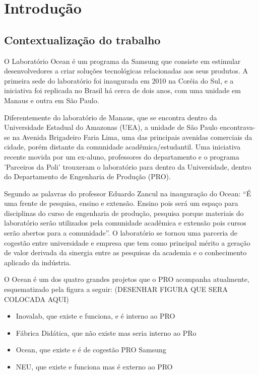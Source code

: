 \chapter[Introdução]{Introdução}
\label{chap:introducao}
\section{Contextualização do trabalho}
\label{cha:contexto}

O Laboratório Ocean é um programa da Samsung que consiste em estimular desenvolvedores a criar soluções tecnológicas relacionadas aos seus produtos. A primeira sede do laboratório foi inaugurada em 2010 na Coréia do Sul, e a iniciativa foi replicada no Brasil há cerca de dois anos, com uma unidade em Manaus e outra em São Paulo.

Diferentemente do laboratório de Manaus, que se encontra dentro da Universidade Estadual do Amazonas (UEA), a unidade de São Paulo encontrava-se na Avenida Brigadeiro Faria Lima, uma das principais avenidas comerciais da cidade, porém distante da comunidade acadêmica/estudantil. Uma iniciativa recente movida por um ex-aluno, professores do departamento e o programa 'Parceiros da Poli' trouxeram o laboratório para dentro da Universidade, dentro do Departamento de Engenharia de Produção (PRO).

Segundo as palavras do professor Eduardo Zancul na inauguração do Ocean: “É uma frente de pesquisa, ensino e extensão. Ensino pois será um espaço para disciplinas do curso de engenharia de produção, pesquisa porque materiais do laboratório serão utilizados pela comunidade acadêmica e extensão pois cursos serão abertos para a comunidade”. O laboratório se tornou uma parceria de cogestão entre universidade e empresa que tem como principal mérito a geração de valor derivada da sinergia entre as pesquisas da academia e o conhecimento aplicado da indústria. 

O Ocean é um dos quatro grandes projetos que o PRO acompanha atualmente, esquematizado pela figura a seguir: (DESENHAR FIGURA QUE SERA COLOCADA AQUI)

\begin{itemize}
\item Inovalab, que existe e funciona, e é interno ao PRO
\item Fábrica Didática, que não existe mas seria interno ao PRo
\item Ocean, que existe e é de cogestão PRO Samsung
\item NEU, que existe e funciona mas é externo ao PRO
\end{itemize}

